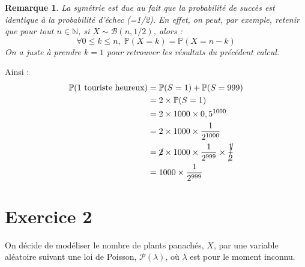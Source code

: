 \documentclass[a4paper,oneside,12pt]{article}
\theoremstyle{plain}
\newtheorem*{remark}{Remarque}
\def\N{{\mathbb N}}
\def\P{{\mathbb P}}
\begin{document}
\begin{enumerate}
    \begin{remark}
    La symétrie est due au fait que la probabilité de succès est identique à la probabilité d'échec (=1/2). En effet, on peut, par exemple, retenir que pour tout $n\in \N$, si $X\sim \mathcal{B}(n, 1/2)$, alors :
    $$\forall 0 \le k \le n,\; \P(X=k) = \P(X = n-k)$$
    On a juste à prendre $k=1$ pour retrouver les résultats du précédent calcul.
    \end{remark}
    
    Ainsi :
    \begin{align*}
        \P(\mbox{1 touriste heureux}) &= \P(S=1) + \P(S=999) \\
        &= 2 \times  \P(S=1) \\
        &= 2\times 1000 \times 0,5^{1000} \\
        &= 2 \times 1000 \times \frac{1}{2^{1000}} \\
        &= \cancel{2} \times 1000 \times \frac{1}{2^{999}} \times \cancel{\frac{1}{2}}\\
        &=1000 \times \frac{1}{2^{999}}
    \end{align*}
\end{enumerate}

\section*{Exercice 2}

On décide de modéliser le nombre de plants panachés, $X$, par une variable aléatoire suivant une loi de Poisson, $\mathcal{P}(\lambda)$, où $\lambda$ est pour le moment inconnu.
\end{document}
